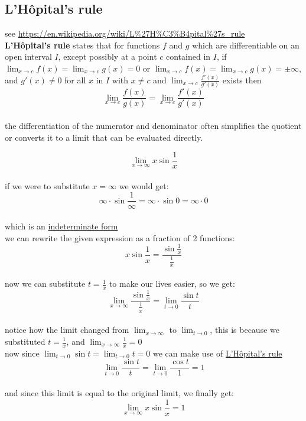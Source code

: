 \documentclass[a4paper,12pt]{article}
\newcommand{\?}{\stackrel{?}{=}}
\begin{document}
\subsection{L'Hôpital's rule}
\label{sec:org3873de8}
see \url{https://en.wikipedia.org/wiki/L\%27H\%C3\%B4pital\%27s\_rule}\\[0pt]
\textbf{L'Hôpital's rule} states that for functions \(f\) and \(g\) which are differentiable on an open interval \(I\), except possibly at a point \(c\) contained in \(I\), if \(\lim_{x\to c} f(x) = \lim_{x\to c} g(x) = 0\) or \(\lim_{x\to c} f(x) = \lim_{x\to c} g(x) = \pm\infty\), and \(g'(x) \neq 0\) for all \(x\) in \(I\) with \(x \neq c\) and \(\lim_{x\to c} \frac{f'(x)}{g'(x)}\) exists then\\[0pt]
\[
  \lim_{x\to c} \frac{f(x)}{g(x)} = \lim_{x\to c} \frac{f'(x)}{g'(x)}
\]\\[0pt]
the differentiation of the numerator and denominator often simplifies the quotient or converts it to a limit that can be evaluated directly.\\[0pt]

\begin{my_example}
\[
  \lim_{x\to \infty} x\sin\frac1x
\]\\[0pt]
if we were to substitute \(x=\infty\) we would get:\\[0pt]
\[
   \infty \cdot \sin\frac1\infty = \infty \cdot \sin0 = \infty \cdot 0
\]\\[0pt]
which is an \hyperref[sec:orgd592a44]{indeterminate form}\\[0pt]
we can rewrite the given expression as a fraction of 2 functions:\\[0pt]
\[
  x\sin\frac1x =\frac{\sin\frac1x}{\frac1x}
\]\\[0pt]
now we can substitute \(t=\frac{1}{x}\) to make our lives easier, so we get:\\[0pt]
\[
  \lim_{x\to \infty} \frac{\sin\frac1x}{\frac1x} = \lim_{t\to 0} \frac{\sin{t}}{t}
\]\\[0pt]
notice how the limit changed from \(\lim_{x\to \infty}\) to \(\lim_{t\to 0}\), this is because we substituted \(t=\frac{1}{x}\), and \(\lim_{x\to \infty} \frac{1}{x} = 0\)\\[0pt]
now since \(\lim_{t\to 0} \sin{t} = \lim_{t\to 0} t = 0\) we can make use of \hyperref[sec:org3873de8]{L'Hôpital's rule}\\[0pt]
\[
  \lim_{t\to 0} \frac{\sin{t}}{t} = \lim_{t\to 0} \frac{\cos{t}}{1} = 1
\]\\[0pt]
and since this limit is equal to the original limit, we finally get:\\[0pt]
\[
  \lim_{x\to \infty} x\sin\frac1x = 1
\]\\[0pt]
\end{my_example}
\end{document}
